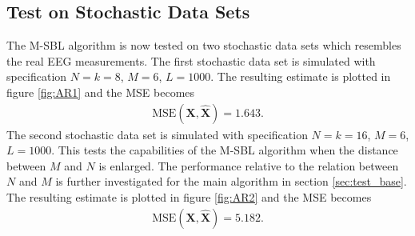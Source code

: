 \subsection{Test on Stochastic Data Sets}\label{sec:testMsbl_stoch}
The M-SBL algorithm is now tested on two stochastic data sets which resembles the real EEG measurements. 
The first stochastic data set is simulated with specification $N=k=8$, $M = 6$, $L=1000$. 
The resulting estimate is plotted in figure \ref{fig:AR1} and the MSE becomes 
\begin{align*}
\text{MSE}(\mathbf{X}, \hat{\mathbf{X}}) = 1.643.
\end{align*}  
The second stochastic data set is simulated with specification $N=k=16$, $M = 6$, $L=1000$. 
This tests the capabilities of the M-SBL algorithm when the distance between $M$ and $N$ is enlarged. 
The performance relative to the relation between $N$ and $M$ is further investigated for the main algorithm in section \ref{sec:test_base}.
The resulting estimate is plotted in figure \ref{fig:AR2} and the MSE becomes 
\begin{align*}
\text{MSE}(\mathbf{X}, \hat{\mathbf{X}}) = 5.182. 
\end{align*}  

